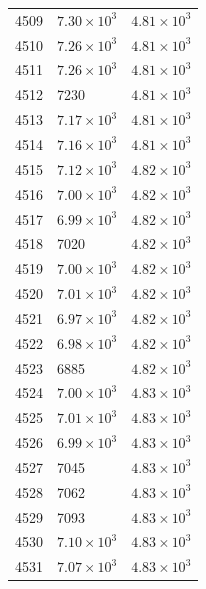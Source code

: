 \begin{table}[H]
\begin{tabular}{lll}
4509 & $\displaystyle 7.30 \times 10^{3}$ & $\displaystyle 4.81 \times 10^{3}$ \\
4510 & $\displaystyle 7.26 \times 10^{3}$ & $\displaystyle 4.81 \times 10^{3}$ \\
4511 & $\displaystyle 7.26 \times 10^{3}$ & $\displaystyle 4.81 \times 10^{3}$ \\
4512 & 7230 & $\displaystyle 4.81 \times 10^{3}$ \\
4513 & $\displaystyle 7.17 \times 10^{3}$ & $\displaystyle 4.81 \times 10^{3}$ \\
4514 & $\displaystyle 7.16 \times 10^{3}$ & $\displaystyle 4.81 \times 10^{3}$ \\
4515 & $\displaystyle 7.12 \times 10^{3}$ & $\displaystyle 4.82 \times 10^{3}$ \\
4516 & $\displaystyle 7.00 \times 10^{3}$ & $\displaystyle 4.82 \times 10^{3}$ \\
4517 & $\displaystyle 6.99 \times 10^{3}$ & $\displaystyle 4.82 \times 10^{3}$ \\
4518 & 7020 & $\displaystyle 4.82 \times 10^{3}$ \\
4519 & $\displaystyle 7.00 \times 10^{3}$ & $\displaystyle 4.82 \times 10^{3}$ \\
4520 & $\displaystyle 7.01 \times 10^{3}$ & $\displaystyle 4.82 \times 10^{3}$ \\
4521 & $\displaystyle 6.97 \times 10^{3}$ & $\displaystyle 4.82 \times 10^{3}$ \\
4522 & $\displaystyle 6.98 \times 10^{3}$ & $\displaystyle 4.82 \times 10^{3}$ \\
4523 & 6885 & $\displaystyle 4.82 \times 10^{3}$ \\
4524 & $\displaystyle 7.00 \times 10^{3}$ & $\displaystyle 4.83 \times 10^{3}$ \\
4525 & $\displaystyle 7.01 \times 10^{3}$ & $\displaystyle 4.83 \times 10^{3}$ \\
4526 & $\displaystyle 6.99 \times 10^{3}$ & $\displaystyle 4.83 \times 10^{3}$ \\
4527 & 7045 & $\displaystyle 4.83 \times 10^{3}$ \\
4528 & 7062 & $\displaystyle 4.83 \times 10^{3}$ \\
4529 & 7093 & $\displaystyle 4.83 \times 10^{3}$ \\
4530 & $\displaystyle 7.10 \times 10^{3}$ & $\displaystyle 4.83 \times 10^{3}$ \\
4531 & $\displaystyle 7.07 \times 10^{3}$ & $\displaystyle 4.83 \times 10^{3}$ \\

\end{tabular}
\end{table}

